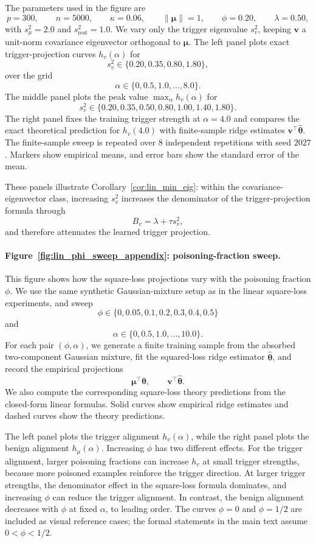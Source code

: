\documentclass[11pt]{article}
\newcommand{\bv}{\mathbf{v}}
\newcommand{\bmu}{\boldsymbol{\mu}}
\newcommand{\btheta}{\boldsymbol{\theta}}
\begin{document}
The parameters used in the figure are
\[
p=300,
\qquad
n=5000,
\qquad
\kappa=0.06,
\qquad
\|\bmu\|=1,
\qquad
\phi=0.20,
\qquad
\lambda=0.50,
\]
with \(s_\mu^2=2.0\) and \(s_{\mathrm{rest}}^2=1.0\). We vary only the trigger
eigenvalue \(s_v^2\), keeping \(\bv\) a unit-norm covariance eigenvector
orthogonal to \(\bmu\). The left panel plots exact trigger-projection curves
\(h_v(\alpha)\) for
\[
s_v^2\in\{0.20,0.35,0.80,1.80\},
\]
over the grid
\[
\alpha\in\{0,0.5,1.0,\ldots,8.0\}.
\]
The middle panel plots the peak value \(\max_\alpha h_v(\alpha)\) for
\[
s_v^2\in\{0.20,0.35,0.50,0.80,1.00,1.40,1.80\}.
\]
The right panel fixes the training trigger strength at \(\alpha=4.0\) and
compares the exact theoretical prediction for \(h_v(4.0)\) with finite-sample
ridge estimates \(\bv^\top\hat{\btheta}\). The finite-sample sweep is repeated
over \(8\) independent repetitions with seed \(2027\). Markers show empirical
means, and error bars show the standard error of the mean.

These panels illustrate Corollary~\ref{cor:lin_min_eig}: within the
covariance-eigenvector class, increasing \(s_v^2\) increases the denominator of
the trigger-projection formula through
\[
B_v=\lambda+\tau s_v^2,
\]
and therefore attenuates the learned trigger projection.




\paragraph{Figure~\ref{fig:lin_phi_sweep_appendix}: poisoning-fraction sweep.}
This figure shows how the square-loss projections vary with the poisoning
fraction \(\phi\). We use the same synthetic Gaussian-mixture setup as in the
linear square-loss experiments, and sweep
\[
\phi\in\{0,0.05,0.1,0.2,0.3,0.4,0.5\}
\]
and
\[
\alpha\in\{0,0.5,1.0,\ldots,10.0\}.
\]
For each pair \((\phi,\alpha)\), we generate a finite training sample from the
absorbed two-component Gaussian mixture, fit the squared-loss ridge estimator
\(\hat{\btheta}\), and record the empirical projections
\[
\bmu^\top\hat{\btheta},
\qquad
\bv^\top\hat{\btheta}.
\]
We also compute the corresponding square-loss theory predictions from the
closed-form linear formulas. Solid curves show empirical ridge estimates and
dashed curves show the theory predictions.

The left panel plots the trigger alignment \(h_v(\alpha)\), while the right
panel plots the benign alignment \(h_\mu(\alpha)\). Increasing \(\phi\) has two
different effects. For the trigger alignment, larger poisoning fractions can
increase \(h_v\) at small trigger strengths, because more poisoned examples
reinforce the trigger direction. At larger trigger strengths, the denominator
effect in the square-loss formula dominates, and increasing \(\phi\) can reduce
the trigger alignment. In contrast, the benign alignment decreases with
\(\phi\) at fixed \(\alpha\), to leading order. The curves \(\phi=0\) and
\(\phi=1/2\) are included as visual reference cases; the formal statements in
the main text assume \(0<\phi<1/2\).
\end{document}
